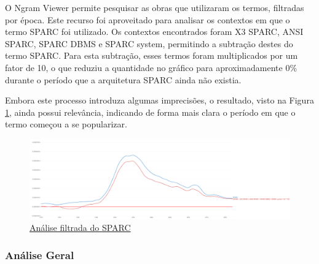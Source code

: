 \documentclass[
	article,			%
	11pt,				%
	oneside,			%
	a4paper,			%
	english,			%
	brazil,				%
	sumario=tradicional
	]{abntex2}
\begin{document}
O Ngram Viewer permite pesquisar as obras que utilizaram os termos, filtradas por época. Este recurso foi aproveitado para analisar os contextos em que o termo SPARC foi utilizado. Os contextos encontrados foram X3 SPARC, ANSI SPARC, SPARC DBMS e SPARC system, permitindo a subtração destes do termo SPARC. Para esta subtração, esses termos foram multiplicados por um fator de 10, o que reduziu a quantidade no gráfico para aproximadamente 0\% durante o período que a arquitetura SPARC ainda não existia.

Embora este processo introduza algumas imprecisões, o resultado, visto na Figura \ref{fig:NgramSPARC_Clean}, ainda possui relevância, indicando de forma mais clara o período em que o termo começou a se popularizar.

\begin{figure}[h]
    \centering
    \includegraphics[width=1\linewidth]{Ngrams/SPARC_CLEAN.png}
    \caption{\href{https://books.google.com/ngrams/graph?content=SPARC,SPARC-((X3+SPARC+\%2B+ANSI+SPARC+\%2B+SPARC+DBMS+\%2B+SPARC+system+*+3)*10)&year_start=1970&year_end=2022&corpus=en&smoothing=1&case_insensitive=false}{Análise filtrada do SPARC}}
    \label{fig:NgramSPARC_Clean}
\end{figure}

\subsubsection{Análise Geral}
\end{document}
